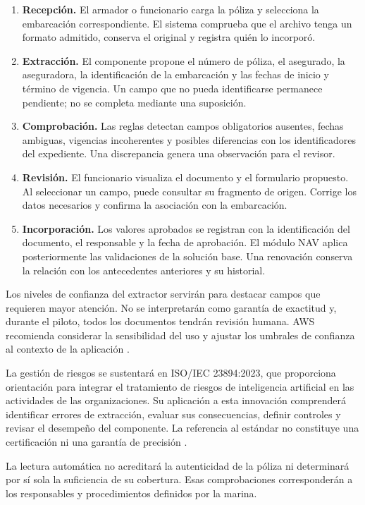 \begin{enumerate}
    \item \textbf{Recepción.} El armador o funcionario carga la póliza y selecciona la embarcación correspondiente. El sistema comprueba que el archivo tenga un formato admitido, conserva el original y registra quién lo incorporó.
    \item \textbf{Extracción.} El componente propone el número de póliza, el asegurado, la aseguradora, la identificación de la embarcación y las fechas de inicio y término de vigencia. Un campo que no pueda identificarse permanece pendiente; no se completa mediante una suposición.
    \item \textbf{Comprobación.} Las reglas detectan campos obligatorios ausentes, fechas ambiguas, vigencias incoherentes y posibles diferencias con los identificadores del expediente. Una discrepancia genera una observación para el revisor.
    \item \textbf{Revisión.} El funcionario visualiza el documento y el formulario propuesto. Al seleccionar un campo, puede consultar su fragmento de origen. Corrige los datos necesarios y confirma la asociación con la embarcación.
    \item \textbf{Incorporación.} Los valores aprobados se registran con la identificación del documento, el responsable y la fecha de aprobación. El módulo NAV aplica posteriormente las validaciones de la solución base. Una renovación conserva la relación con los antecedentes anteriores y su historial.
\end{enumerate}

Los niveles de confianza del extractor servirán para destacar campos que requieren mayor atención. No se interpretarán como garantía de exactitud y, durante el piloto, todos los documentos tendrán revisión humana. AWS recomienda considerar la sensibilidad del uso y ajustar los umbrales de confianza al contexto de la aplicación \parencite{in3-aws-practicas}.

La gestión de riesgos se sustentará en ISO/IEC 23894:2023, que proporciona orientación para integrar el tratamiento de riesgos de inteligencia artificial en las actividades de las organizaciones. Su aplicación a esta innovación comprenderá identificar errores de extracción, evaluar sus consecuencias, definir controles y revisar el desempeño del componente. La referencia al estándar no constituye una certificación ni una garantía de precisión \parencite{in3-iso23894}.

La lectura automática no acreditará la autenticidad de la póliza ni determinará por sí sola la suficiencia de su cobertura. Esas comprobaciones corresponderán a los responsables y procedimientos definidos por la marina.

